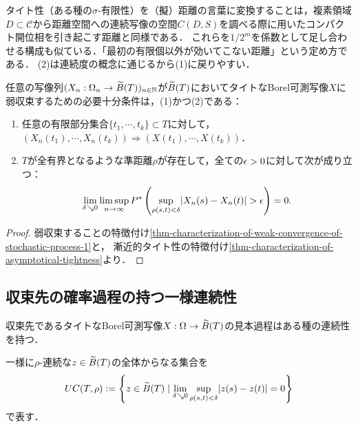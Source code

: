 \documentclass[uplatex,dvipdfmx]{jsreport}
\renewcommand{\C}{\mathcal{C}}
\begin{document}
\begin{remarks}
    タイト性（ある種の$\sigma$-有限性）を（擬）距離の言葉に変換することは，複素領域$D\subset\C$から距離空間への連続写像の空間$C(D,S)$を調べる際に用いたコンパクト開位相を引き起こす距離と同様である．
    これらを$1/2^m$を係数として足し合わせる構成も似ている．「最初の有限個以外が効いてこない距離」という定め方である．
    (2)は連続度の概念に通じるから(1)に戻りやすい．
\end{remarks}

\begin{corollary}[タイトな確率過程に弱収束する条件の特徴付け２]\label{cor-characterization-of-weak-convergence-of-stochastic-process-2}
    任意の写像列$(X_n:\Omega_n\to\widetilde{B}(T))_{n\in\mathbb{N}}$が$\widetilde{B}(T)$においてタイトなBorel可測写像$X$に弱収束するための必要十分条件は，(1)かつ(2)である：
    \begin{enumerate}
        \item 任意の有限部分集合$\{t_1,\cdots,t_k\}\subset T$に対して，$(X_n(t_1),\cdots,X_n(t_k))\Rightarrow(X(t_1),\cdots,X(t_k))$．
        \item $T$が全有界となるような準距離$\rho$が存在して，全ての$\epsilon>0$に対して次が成り立つ：
        \[\lim_{\delta\searrow 0}\limsup_{n\to\infty} P^*\left(\sup_{\rho(s,t)<\delta}\lvert X_n(s)-X_n(t)\rvert>\epsilon\right)=0.\]
    \end{enumerate}
\end{corollary}
\begin{proof}
    弱収束することの特徴付け\ref{thm-characterization-of-weak-convergence-of-stochastic-process-1}と，
    漸近的タイト性の特徴付け\ref{thm-characterization-of-asymptotical-tightness}より．
\end{proof}

\subsection{収束先の確率過程の持つ一様連続性}

\begin{tcolorbox}[colframe=ForestGreen, colback=ForestGreen!10!white,breakable,colbacktitle=ForestGreen!40!white,coltitle=black,fonttitle=\bfseries\sffamily,
title=]
    収束先であるタイトなBorel可測写像$X:\Omega\to\widetilde{B}(T)$の見本過程はある種の連続性を持つ．
\end{tcolorbox}

\begin{notation}
    一様に$\rho$-連続な$z\in\widetilde{B}(T)$の全体からなる集合を
    \[UC(T,\rho):=\left\{z\in\widetilde{B}(T)\mid\lim_{\delta\searrow 0}\sup_{\rho(s,t)<\delta}\lvert z(s)-z(t)\rvert=0\right\}\]
    で表す．
\end{notation}
\end{document}
